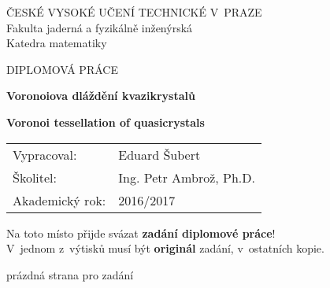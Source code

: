 \documentclass[a4paper,10pt,twoside]{report}
\theoremstyle{remark}
\begin{document}
\clearpage
\thispagestyle{empty}
\cleardoublepage

\thispagestyle{empty}

\begin{center}

{\Large ČESKÉ VYSOKÉ UČENÍ TECHNICKÉ V~PRAZE} \\[3.5mm]
{\Large Fakulta jaderná a fyzikálně inženýrská} \\[3.5mm]
{\Large Katedra matematiky}


{\Large DIPLOMOVÁ PRÁCE}


{\LARGE
\textbf{Voronoiova dláždění kvazikrystalů}
\par}

\vspace{1cm}

{\LARGE
\textbf{Voronoi tessellation of quasicrystals}
\par}


\end{center}

\begin{tabular}{ll} 
{\Large Vypracoval:} & {\Large Eduard Šubert} \\[1mm]
{\Large \v{S}kolitel:} & {\Large Ing. Petr Ambrož, Ph.D.} \\[2mm]
{\Large Akademický rok:}     & {\Large 2016/2017}
\end{tabular}


\clearpage
\thispagestyle{empty}
\cleardoublepage

\thispagestyle{empty}

\noindent
{\Large
Na toto místo přijde svázat \textbf{zadání diplomové práce}!\\
V~jednom z~výtisků musí být \textbf{originál} zadání, v~ostatních kopie.\par}
\newpage
prázdná strana pro zadání
\end{document}
